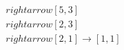 \documentclass[preview]{standalone}
\begin{document}
\begin{align*}
[8, 3] \\rightarrow [5, 3] \\rightarrow [2, 3] \\rightarrow [2, 1] \rightarrow [1,1]
\end{align*}
\end{document}
